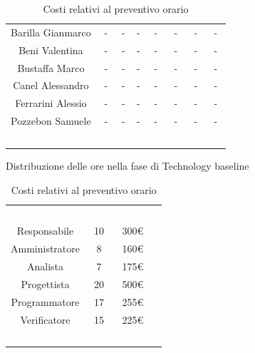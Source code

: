 \begin{table}[h!]
\begin{minipage}[c]{0.53\textwidth}
\begin{tabular}{>{\raggedright\arraybackslash}c|cccccc|c}
		\rowcolor[RGB]{216, 235, 171}
	    	Barilla Gianmarco & - & - & - & - & - & -& -		\\[4pt]
	    \rowcolor[RGB]{233, 245, 206}
	    	Beni Valentina & - & - & - & - & - & -& -			\\[4pt]
	    \rowcolor[RGB]{216, 235, 171}
	    	Bustaffa Marco & - & - & - & - & - & -& -			\\[4pt]
        \rowcolor[RGB]{233, 245, 206}
	    	Canel Alessandro & - & - & - & - & - & -& -			\\[4pt]
        \rowcolor[RGB]{216, 235, 171}
	    	Ferrarini Alessio & - & - & - & - & - & -& -		\\[4pt]
        \rowcolor[RGB]{233, 245, 206}
	    	Pozzebon Samuele & - & - & - & - & - & -& -			\\[4pt]
		\rowcolor[RGB]{47, 106, 73}
			\textcolor{white}{Totale Ruolo} & \textcolor{white}{10} & \textcolor{white}{8} & \textcolor{white}{7} 
			& \textcolor{white}{20} & \textcolor{white}{17} & \textcolor{white}{15}
			& \textcolor{white}{77} \\[4pt]	
    \end{tabular}
    \caption{Distribuzione delle ore nella fase di Technology baseline}
\end{minipage}
\hfill
\begin{minipage}{0.33\textwidth}
	\centering
	\begin{tabular}{cccc}
	    \rowcolor[RGB]{33, 73, 50}
	    \textcolor{white}{\textbf{Ruolo}} & \textcolor{white}{\textbf{Ore}} & \textcolor{white}{\textbf{Costo}}\\[4pt]
	    \rowcolor[RGB]{216, 235, 171}
	    Responsabile & 10 & 300\euro\\[4pt]
	    \rowcolor[RGB]{233, 245, 206}
	    Amministratore & 8 & 160\euro\\[4pt]
        \rowcolor[RGB]{216, 235, 171}
	    Analista & 7 & 175\euro\\[4pt]
	    \rowcolor[RGB]{233, 245, 206}
	    Progettista & 20 & 500\euro\\[4pt]
        \rowcolor[RGB]{216, 235, 171}
	    Programmatore & 17 & 255\euro\\[4pt]
	    \rowcolor[RGB]{233, 245, 206}
	    Verificatore & 15 & 225\euro\\[4pt]
		\rowcolor[RGB]{47, 106, 73}
			\textcolor{white}{Totale} & \textcolor{white}{77} & \textcolor{white}{1615\euro}\\[4pt]	
    \end{tabular}	
	\caption{Costi relativi al preventivo orario}

\end{minipage}
\end{table}

